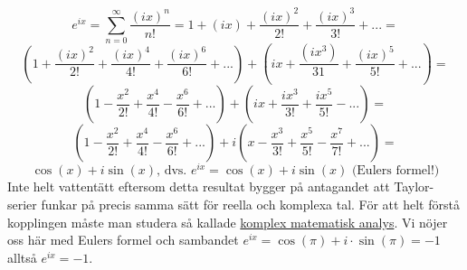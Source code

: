 \begin{equation*}
    e^{ix}=
    \sum_{n=0}^\infty\frac{(ix)^n}{n!}=
    1+(ix)+\frac{(ix)^2}{2!}+\frac{(ix)^3}{3!}+...=
\end{equation*}
\begin{equation*}
    (1+\frac{(ix)^2}{2!}+\frac{(ix)^4}{4!}+\frac{(ix)^6}{6!}+...)+(ix+\frac{(ix^3)}{31}+\frac{(ix)^5}{5!}+...)=
\end{equation*}
\begin{equation*}
    (1-\frac{x^2}{2!}+\frac{x^4}{4!}-\frac{x^6}{6!}+...)+(ix+\frac{ix^3}{3!}+\frac{ix^5}{5!}-...)=
\end{equation*}
\begin{equation*}
    (1-\frac{x^2}{2!}+\frac{x^4}{4!}-\frac{x^6}{6!}+...)+i(x-\frac{x^3}{3!}+\frac{x^5}{5!}-\frac{x^7}{7!}+...)=
\end{equation*}
\begin{equation*}
    \cos(x)+i\sin(x)\text{, dvs. }
    e^{ix}=\cos(x)+i\sin(x)\text{ (Eulers formel!)}
\end{equation*}
Inte helt vattentätt eftersom detta resultat bygger på antagandet att Taylor-serier funkar på precis samma sätt för reella och komplexa tal.
För att helt förstå kopplingen måste man studera så kallade \underline{komplex matematisk analys}.
Vi nöjer oss här med Eulers formel och sambandet $e^{ix}=\cos(\pi)+i\cdot\sin(\pi)=-1$ alltså $e^{ix}=-1$.